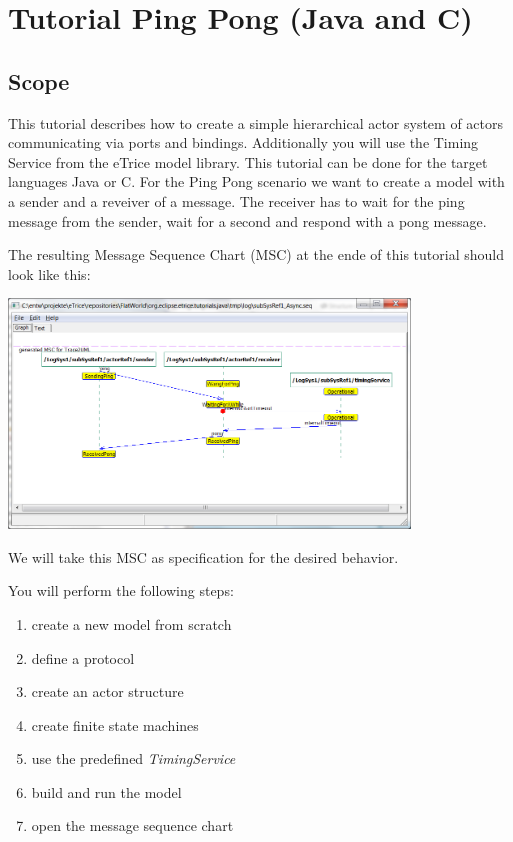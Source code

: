 \section{Tutorial Ping Pong (Java and C)}

\subsection{Scope}

This tutorial describes how to create a simple hierarchical actor system of actors communicating via ports and bindings. 
Additionally you will use the Timing Service from the eTrice model library.
This tutorial can be done for the target languages Java or C.
For the Ping Pong scenario we want to create a model with a sender and a reveiver of a message. The receiver has to wait for the ping message from the sender, wait for a second and respond with a pong message.

The resulting Message Sequence Chart (MSC) at the ende of this tutorial should look like this:

\includegraphics[width=0.8\textwidth]{images/017-01-MSC.png}

We will take this MSC as specification for the desired behavior.

You will perform the following steps:

\begin{enumerate}
\item create a new model from scratch
\item define a protocol
\item create an actor structure
\item create finite state machines
\item use the predefined \textit{TimingService}
\item build and run the model
\item open the message sequence chart
\end{enumerate}

